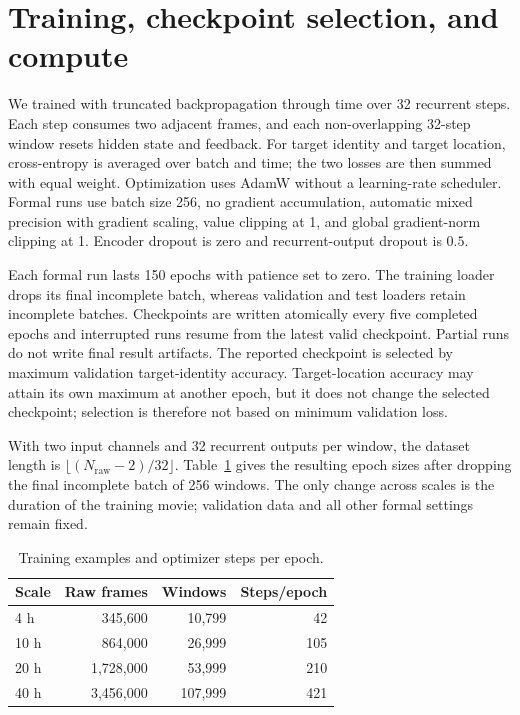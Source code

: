 \section{Training, checkpoint selection, and compute}
\label{app:training}

We trained with truncated backpropagation through time over 32 recurrent steps. Each step consumes two adjacent frames, and each non-overlapping 32-step window resets hidden state and feedback. For target identity and target location, cross-entropy is averaged over batch and time; the two losses are then summed with equal weight. Optimization uses AdamW without a learning-rate scheduler. Formal runs use batch size 256, no gradient accumulation, automatic mixed precision with gradient scaling, value clipping at 1, and global gradient-norm clipping at 1. Encoder dropout is zero and recurrent-output dropout is \(0.5\).

Each formal run lasts 150 epochs with patience set to zero. The training loader drops its final incomplete batch, whereas validation and test loaders retain incomplete batches. Checkpoints are written atomically every five completed epochs and interrupted runs resume from the latest valid checkpoint. Partial runs do not write final result artifacts. The reported checkpoint is selected by maximum validation target-identity accuracy. Target-location accuracy may attain its own maximum at another epoch, but it does not change the selected checkpoint; selection is therefore not based on minimum validation loss.

With two input channels and 32 recurrent outputs per window, the dataset length is \(\lfloor(N_{\mathrm{raw}}-2)/32\rfloor\). Table~\ref{tab:training-scale-steps} gives the resulting epoch sizes after dropping the final incomplete batch of 256 windows. The only change across scales is the duration of the training movie; validation data and all other formal settings remain fixed.

\begin{table}[t]
\centering
\caption{Training examples and optimizer steps per epoch.}
\label{tab:training-scale-steps}
\begin{tabular}{lrrr}
\toprule
Scale & Raw frames & Windows & Steps/epoch \\
\midrule
4 h & 345,600 & 10,799 & 42 \\
10 h & 864,000 & 26,999 & 105 \\
20 h & 1,728,000 & 53,999 & 210 \\
40 h & 3,456,000 & 107,999 & 421 \\
\bottomrule
\end{tabular}
\end{table}

